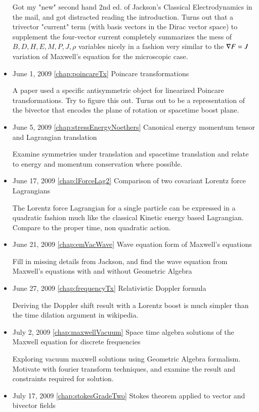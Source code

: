 \begin{itemize}
Got my "new" second hand 2nd ed. of Jackson's Classical Electrodynamics in the mail, and got distracted reading the introduction.  Turns out that a trivector "current" term (with basis vectors in the Dirac vector space) to supplement the four-vector current completely summarizes the mess of $B,D,H,E,M,P,J,\rho$ variables nicely in a fashion very similar to the $\nabla F = J$ variation of Maxwell's equation for the microscopic case.\item June 1, 2009 \ref{chap:poincareTx} Poincare transformations

A paper used a specific antisymmetric object for linearized Poincare transformations.  Try to figure this out.  Turns out to be a representation of the bivector that encodes the plane of rotation or spacetime boost plane.\item June 5, 2009 \ref{chap:stressEnergyNoethers} Canonical energy momentum tensor and Lagrangian translation

Examine symmetries under translation and spacetime translation and relate to energy and momentum conservation where possible.\item June 17, 2009 \ref{chap:lForceLag2} Comparison of two covariant Lorentz force Lagrangians

The Lorentz force Lagrangian for a single particle can be expressed in a quadratic fashion much like the classical Kinetic energy based Lagrangian.  Compare to the proper time, non quadratic action.\item June 21, 2009 \ref{chap:emVacWave} Wave equation form of Maxwell's equations

Fill in missing details from Jackson, and find the wave equation from Maxwell's equations with and without Geometric Algebra\item June 27, 2009 \ref{chap:frequencyTx} Relativistic Doppler formula

Deriving the Doppler shift result with a Lorentz boost is much simpler than the time dilation argument in wikipedia.\item July 2, 2009 \ref{chap:maxwellVacuum} Space time algebra solutions of the Maxwell equation for discrete frequencies

Exploring vacuum maxwell solutions using Geometric Algebra formalism.  Motivate with fourier transform techniques, and examine the result and constraints required for solution.\item July 17, 2009 \ref{chap:stokesGradeTwo} Stokes theorem applied to vector and bivector fields


\end{itemize}
